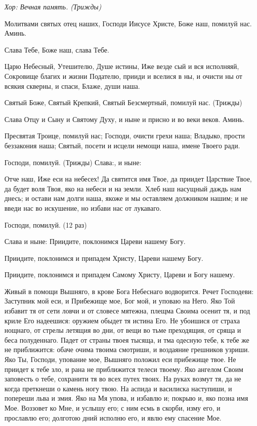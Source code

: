 \itshape Хор:\normalfont{} Вечная память. (\itshape Трижды\normalfont{})
\mychapterending

 


Молитвами святых отец наших, Господи Иисусе Христе, Боже наш, помилуй нас. Аминь. 

Слава Тебе, Боже наш, слава Тебе. 

Царю Небесный, Утешителю, Душе истины, Иже везде сый и вся исполняяй, Сокровище благих и жизни Подателю, прииди и вселися в ны, и очисти ны от всякия скверны, и спаси, Блаже, души наша. 

Святый Боже, Святый Крепкий, Святый Безсмертный, помилуй нас. (Трижды) 

Слава Отцу и Сыну и Святому Духу, и ныне и присно и во веки веков. Аминь. 

Пресвятая Троице, помилуй нас; Господи, очисти грехи наша; Владыко, прости беззакония наша; Святый, посети и исцели немощи наша, имене Твоего ради. 

Господи, помилуй. (Трижды) Слава:, и ныне: 

Отче наш, Иже еси на небесех! Да святится имя Твое, да приидет Царствие Твое, да будет воля Твоя, яко на небеси и на земли. Хлеб наш насущный даждь нам днесь; и остави нам долги наша, якоже и мы оставляем должником нашим; и не введи нас во искушение, но избави нас от лукаваго. 

Господи, помилуй. (12 раз) 

Слава и ныне: Приидите, поклонимся Цареви нашему Богу. 

Приидите, поклонимся и припадем Христу, Цареви нашему Богу. 

Приидите, поклонимся и припадем Самому Христу, Цареви и Богу нашему.




Живый в помощи Вышняго, в крове Бога Небеснаго водворится. Речет Господеви: Заступник мой еси, и Прибежище мое, Бог мой, и уповаю на Него. Яко Той избавит тя от сети ловчи и от словесе мятежна, плещма Своима осенит тя, и под криле Его надеешися: оружием обыдет тя истина Его. Не убоишися от страха нощнаго, от стрелы летящия во дни, от вещи во тьме преходящия, от сряща и беса полуденнаго. Падет от страны твоея тысяща, и тма одесную тебе, к тебе же не приближится: обаче очима твоима смотриши, и воздаяние грешников узриши. Яко Ты, Господи, упование мое, Вышняго положил еси прибежище твое. Не приидет к тебе зло, и рана не приближится телеси твоему. Яко ангелом Своим заповесть о тебе, сохранити тя во всех путех твоих. На руках возмут тя, да не когда преткнеши о камень ногу твою. На аспида и василиска наступиши, и попереши льва и змия. Яко на Мя упова, и избавлю и; покрыю и, яко позна имя Мое. Воззовет ко Мне, и услышу его; с ним есмь в скорби, изму его, и прославлю его; долготою дний исполню его, и явлю ему спасение Мое. 

